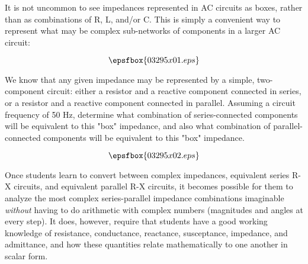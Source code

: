 

It is not uncommon to see impedances represented in AC circuits as boxes, rather than as combinations of R, L, and/or C.  This is simply a convenient way to represent what may be complex sub-networks of components in a larger AC circuit:

$$\epsfbox{03295x01.eps}$$

We know that any given impedance may be represented by a simple, two-component circuit: either a resistor and a reactive component connected in series, or a resistor and a reactive component connected in parallel.  Assuming a circuit frequency of 50 Hz, determine what combination of series-connected components will be equivalent to this "box" impedance, and also what combination of parallel-connected components will be equivalent to this "box" impedance.







$$\epsfbox{03295x02.eps}$$







Once students learn to convert between complex impedances, equivalent series R-X circuits, and equivalent parallel R-X circuits, it becomes possible for them to analyze the most complex series-parallel impedance combinations imaginable {\it without} having to do arithmetic with complex numbers (magnitudes and angles at every step).  It does, however, require that students have a good working knowledge of resistance, conductance, reactance, susceptance, impedance, and admittance, and how these quantities relate mathematically to one another in scalar form.





